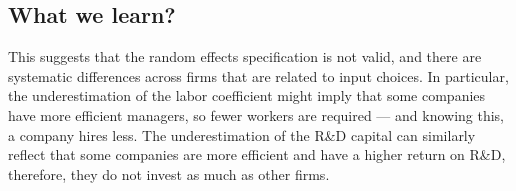 \subsection{What we learn?}

This suggests that the random effects specification is not valid, and there are systematic differences across firms that are related to input choices. In particular, the underestimation of the labor coefficient might imply that some companies have more efficient managers, so fewer workers are required — and knowing this, a company hires less. The underestimation of the R&D capital can similarly reflect that some companies are more efficient and have a higher return on R&D, therefore, they do not invest as much as other firms.